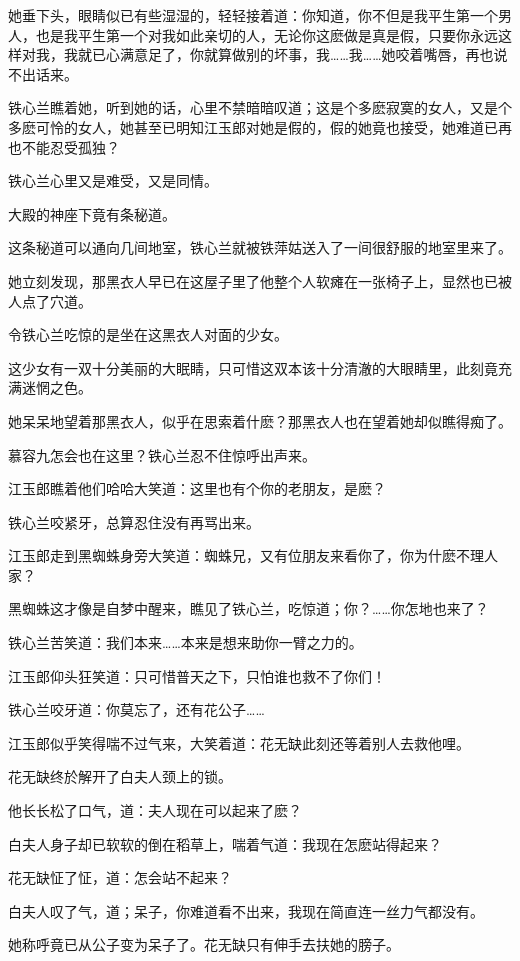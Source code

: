 \documentclass[12pt,oneside]{book}
\begin{document}
她垂下头，眼睛似已有些湿湿的，轻轻接着道：你知道，你不但是我平生第一个男人，也是我平生第一个对我如此亲切的人，无论你这麽做是真是假，只要你永远这样对我，我就已心满意足了，你就算做别的坏事，我\ldots\ldots 我\ldots\ldots 她咬着嘴唇，再也说不出话来。

铁心兰瞧着她，听到她的话，心里不禁暗暗叹道；这是个多麽寂寞的女人，又是个多麽可怜的女人，她甚至已明知江玉郎对她是假的，假的她竟也接受，她难道已再也不能忍受孤独？

铁心兰心里又是难受，又是同情。

大殿的神座下竟有条秘道。

这条秘道可以通向几间地室，铁心兰就被铁萍姑送入了一间很舒服的地室里来了。

她立刻发现，那黑衣人早已在这屋子里了他整个人软瘫在一张椅子上，显然也已被人点了穴道。

令铁心兰吃惊的是坐在这黑衣人对面的少女。

这少女有一双十分美丽的大眠睛，只可惜这双本该十分清澈的大眼睛里，此刻竟充满迷惘之色。

她呆呆地望着那黑衣人，似乎在思索着什麽？那黑衣人也在望着她却似瞧得痴了。

慕容九怎会也在这里？铁心兰忍不住惊呼出声来。

江玉郎瞧着他们哈哈大笑道：这里也有个你的老朋友，是麽？

铁心兰咬紧牙，总算忍住没有再骂出来。

江玉郎走到黑蜘蛛身旁大笑道：蜘蛛兄，又有位朋友来看你了，你为什麽不理人家？

黑蜘蛛这才像是自梦中醒来，瞧见了铁心兰，吃惊道；你？\ldots\ldots 你怎地也来了？

铁心兰苦笑道：我们本来\ldots\ldots 本来是想来助你一臂之力的。

江玉郎仰头狂笑道：只可惜普天之下，只怕谁也救不了你们！

铁心兰咬牙道：你莫忘了，还有花公子\ldots\ldots{}

江玉郎似乎笑得喘不过气来，大笑着道：花无缺此刻还等着别人去救他哩。

花无缺终於解开了白夫人颈上的锁。

他长长松了口气，道：夫人现在可以起来了麽？

白夫人身子却已软软的倒在稻草上，喘着气道：我现在怎麽站得起来？

花无缺怔了怔，道：怎会站不起来？

白夫人叹了气，道；呆子，你难道看不出来，我现在简直连一丝力气都没有。

她称呼竟已从公子变为呆子了。花无缺只有伸手去扶她的膀子。
\end{document}

